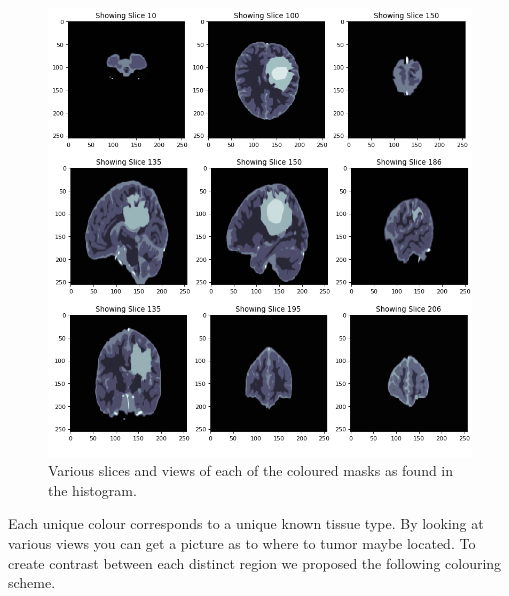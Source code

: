 \begin{figure}[H]
  \centering
  \includegraphics[width=\linewidth]{img/labeledMasks.png}
  \caption{Various slices and views of each of the coloured masks as found in the histogram.}
  \label{fig:labeledMasks}
\end{figure}

Each unique colour corresponds to a unique known tissue type.  By looking at various views you can get a picture as to where to tumor maybe located.  To create contrast between each distinct region we proposed the following colouring scheme.

